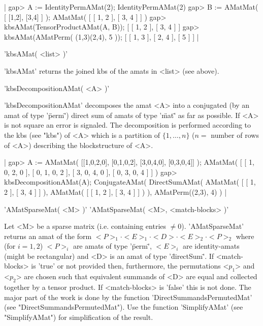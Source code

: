 |    gap> A := IdentityPermAMat(2);
    IdentityPermAMat(2)
    gap> B := AMatMat( [ [1,2], [3,4] ] );
    AMatMat(
      [ [ 1, 2 ], [ 3, 4 ] ]
    )
    gap> kbsAMat(TensorProductAMat(A, B));
    [ [ 1, 2 ], [ 3, 4 ] ]
    gap> kbsAMat(AMatPerm( (1,3)(2,4), 5 ));
    [ [ 1, 3 ], [ 2, 4 ], [ 5 ] ] |

'kbsAMat( <list> )'

'kbsAMat' returns the joined kbs of the amats in <list> (see above).


'kbsDecompositionAMat( <A> )'

'kbsDecompositionAMat' decomposes the amat <A> into a conjugated
(by an amat of type '\"perm\"') direct sum of amats of type '\"mat\"' 
as far as possible. If <A> is not square an error is signaled.
The decomposition is performed according to the 
kbs (see "kbs") of <A> which is a partition of $\{1,\dots,n\}$ 
($n = $ number of rows of <A>) describing the blockstructure of <A>.

|    gap> A := AMatMat( [[1,0,2,0], [0,1,0,2], [3,0,4,0], [0,3,0,4]] );
    AMatMat(
      [ [ 1, 0, 2, 0 ], [ 0, 1, 0, 2 ], [ 3, 0, 4, 0 ], [ 0, 3, 0, 4 ] ]
    )
    gap> kbsDecompositionAMat(A);               
    ConjugateAMat(
      DirectSumAMat(
        AMatMat(
          [ [ 1, 2 ], [ 3, 4 ] ]
        ),
        AMatMat(
          [ [ 1, 2 ], [ 3, 4 ] ]
        )
      ),
      AMatPerm((2,3), 4)
    ) |


'AMatSparseMat( <M> )'
'AMatSparseMat( <M>, <match-blocks> )'

Let <M> be a sparse matrix (i.e. containing entries $\neq 0$).
'AMatSparseMat' returns an amat of the form $<P>_1\cdot <E>_1\cdot
<D>\cdot <E>_2\cdot <P>_2$ where (for $i = 1,2$) $<P>_i$ are amats of type
'\"perm\"', $<E>_i$ are identity-amats (might be rectangular) and <D>
is an amat of type '\"directSum\"'. If <match-blocks> is 'true' or
not provided then, furthermore, the permutations <$p_1$> and <$p_2$>
are chosen such that equivalent summands of <D> are equal and
collected together by a tensor product. 
If <match-blocks> is 'false' this is not done.
The major part of the work is done by the function 
'DirectSummandsPermutedMat' (see "DirectSummandsPermutedMat").
Use the function 'SimplifyAMat' (see "SimplifyAMat") for
simplification of the result.

